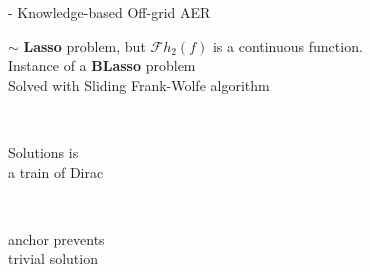 \begin{frame}{\blaster - Knowledge-based Off-grid AER}
        \pause
        \begin{center}
            $\sim$ \textbf{Lasso} problem, but $\mathcal{F}h_2 (f)$ is a continuous function.
            \\Instance of a \textbf{BLasso} problem~\cite{bredies2020sparsity}
            \\Solved with Sliding Frank-Wolfe algorithm \cite{denoyelle2019sliding}
        \end{center}

        \begin{center}
            \textcolor{mygreen}{ \qquad
            \cmark \, \parbox{8.5em}{Solutions is \\ a train of Dirac} \qquad
            \cmark \, \parbox{8em}{anchor prevents \\ trivial solution}}
        \end{center}

\end{frame}

